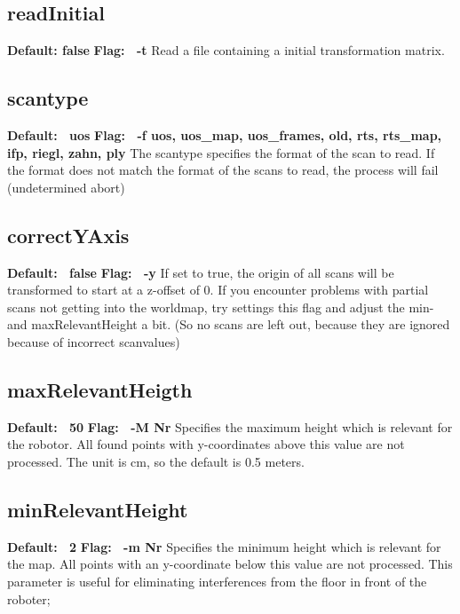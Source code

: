 \documentclass{article}
\begin{document}
\subsection{readInitial}
{\bf Default: false} \newline
{\bf Flag: \ -t} \newline
Read a file containing a initial transformation matrix.


\subsection{scantype}
{\bf Default: \ uos} \newline
{\bf Flag: \ -f {uos, uos_map, uos_frames, old, rts, rts_map, ifp, riegl, zahn, ply}} \newline
The scantype specifies the format of the scan to read. If the format does not
match the format of the scans to read, the process will fail (undetermined
abort)

\subsection{correctYAxis}
{\bf Default: \ false} \newline
{\bf Flag: \ -y} \newline
If set to true, the origin of all scans will be transformed to start at a
z-offset of 0. If you encounter problems with partial scans not getting into
the worldmap, try settings this flag and adjust the min- and maxRelevantHeight
a bit. (So no scans are left out, because they are ignored because of incorrect
scanvalues)

\subsection{maxRelevantHeigth}
{\bf Default: \ 50} \newline
{\bf Flag: \ -M Nr} \newline
Specifies the maximum height which is relevant for the robotor. All found
points with y-coordinates above this value are not processed.
The unit is cm, so the default is 0.5 meters.


\subsection{minRelevantHeight}
{\bf Default: \ 2} \newline
{\bf Flag: \ -m Nr} \newline
Specifies the minimum height which is relevant for the map. All points with an y-coordinate below this value are not processed. 
This parameter is useful for eliminating interferences from the floor in front of the roboter;
\end{document}
